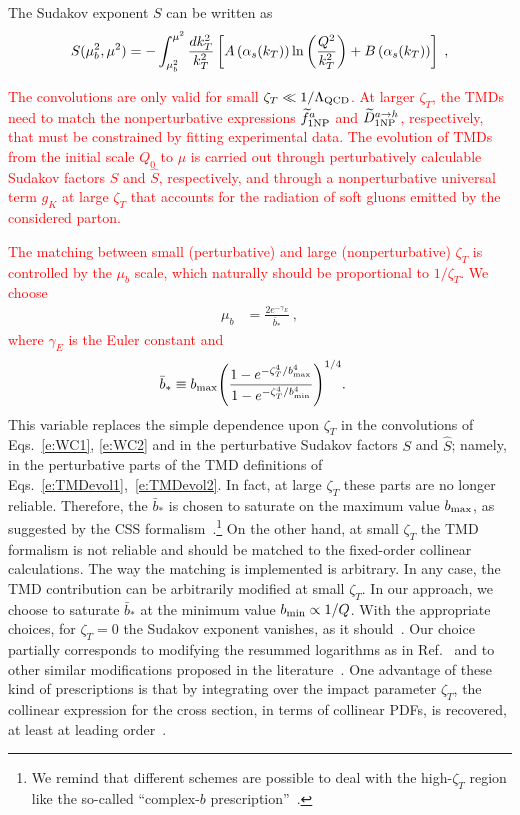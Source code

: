 \documentclass[aps,preprintnumbers,showpacs,nofootinbib,superscriptaddress,floatfix]{revtex4}
\newcommand{\bT}{\zeta_T}
\begin{document}
The Sudakov exponent $S$ can be written as
\begin{equation} 
S(\mu_b^2,\mu^2)=-\int_{\mu_b^2}^{\mu^2}{dk_T^2\over k_T^2}
\left[A\left(\alpha_s(k_T)\right)\ln\left({Q^2\over k_T^2}\right) 
+ B\left(\alpha_s(k_T)\right) \right] \; ,
\label{Sudakov} 
\end{equation} 

\textcolor{red}{The convolutions are only valid for small $\bT \ll
  1/\Lambda_{\rm QCD}$. At larger $\bT$, the TMDs need to match the
  nonperturbative expressions $\widetilde{f}_{1 \rm NP}^a$ and
  $\widetilde{D}_{1 {\rm NP}}^{a\to h}$, respectively, that must be
  constrained by fitting experimental data. The evolution of TMDs from the
  initial scale $Q_0$ to $\mu$ is carried out through perturbatively
  calculable Sudakov factors $S$ and $\hat{S}$, respectively, and through a
  nonperturbative universal term $g_K$ at large $\bT$ that accounts for the
  radiation of soft gluons emitted by the considered parton. } 

\textcolor{red}{The matching between small (perturbative) and large (nonperturbative) $\bT$ is controlled by the $\mu_b$ scale, which naturally should be proportional to $1/\bT$. We choose }
\begin{align} 
\mu_b &= \frac{2 e^{-\gamma_E}}{\bar{b}_{\ast}} \  ,
\label{e:mub}
\end{align}  
\textcolor{red}{where $\gamma_E$ is the Euler constant and }
\begin{align} 
\bar{b}_{\ast} &\equiv b_{\rm max} \Bigg(\frac{1-e^{- \bT^4 / b_{\rm max}^4} }{1-e^{- \bT^4 / b_{\rm min}^4}} \Bigg)^{1/4} .
\label{e:b*}
\end{align}  
This variable replaces the simple dependence upon $\bT$ in the
  convolutions of Eqs.~\eqref{e:WC1}, \eqref{e:WC2} and in the perturbative
  Sudakov factors $S$ and $\hat{S}$; namely, in the perturbative parts of the
  TMD definitions of Eqs.~\eqref{e:TMDevol1},~\eqref{e:TMDevol2}. In fact, at
  large $\bT$ these parts are no longer reliable. Therefore, the
  $\bar{b}_{\ast}$ is chosen to saturate on the maximum value $b_{\rm max}$,
  as suggested by the CSS 
  formalism~\cite{Collins:2011zzd,Aybat:2011zv}.\footnote{We remind that
  different schemes are possible to deal with 
the high-$\bT$ region like the so-called ``complex-$b$
prescription''~\cite{Laenen:2000de}.}
On the other hand, at
small $\bT$ the TMD formalism is not reliable and should be 
matched to the fixed-order collinear
calculations. The way
the matching is implemented is arbitrary.  In any case, the TMD contribution
can be arbitrarily modified at small $\bT$. In our approach, we choose to
saturate 
$\bar{b}_{\ast}$  at
the minimum value $b_{\rm min}\propto 1/Q$. With the appropriate choices, 
for $\bT=0$ the Sudakov exponent vanishes, as it
should~\cite{Parisi:1979se,Altarelli:1984pt}. 
Our choice partially corresponds to modifying the resummed logarithms as in
Ref.~\cite{Bozzi:2010xn} and to other similar modifications proposed in the
literature~\cite{Boer:2014tka,Collins:2016hqq}. One advantage of these kind of
prescriptions is that by integrating over the impact parameter $\bT$, the
collinear expression for the cross section, in terms of collinear PDFs, is
recovered, at least at leading order~\cite{Collins:2016hqq}.
\end{document}
